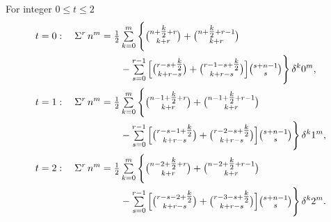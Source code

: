\begin{example}
  For integer $0 \leq t \leq 2$
  \begin{align*}
    t=0:\quad
    \Sigma^{r}\,{n}^{m}
    &=
    \tfrac12
    \mathop{\textstyle\sum}_{k=0}^{m}
    \Bigg\{
      \tbinom{n+\tfrac{k}{2}+r}{k+r}
      +
      \tbinom{n+\tfrac{k}{2}+r-1}{k+r}
      \\
      &\qquad-
      \mathop{\textstyle\sum}_{s=0}^{r-1}
      \Big[
        \tbinom{r-s+\tfrac{k}{2}}{k+r-s}
        +
        \tbinom{r-1-s+\tfrac{k}{2}}{k+r-s}
      \Big]
      \tbinom{s+n-1}{s}
    \Bigg\}
    \,\delta^k 0^m ,
    \\
    t=1:\quad
    \Sigma^{r}\,{n}^{m}
    &=
    \tfrac12
    \mathop{\textstyle\sum}_{k=0}^{m}
    \Bigg\{
      \tbinom{n-1+\tfrac{k}{2}+r}{k+r}
      +
      \tbinom{n-1+\tfrac{k}{2}+r-1}{k+r}
      \\
      &\qquad-
      \mathop{\textstyle\sum}_{s=0}^{r-1}
      \Big[
        \tbinom{r-s-1+\tfrac{k}{2}}{k+r-s}
        +
        \tbinom{r-2-s+\tfrac{k}{2}}{k+r-s}
      \Big]
      \tbinom{s+n-1}{s}
    \Bigg\}
    \,\delta^k 1^m ,
    \\
    t=2:\quad
    \Sigma^{r}\,{n}^{m}
    &=
    \tfrac12
    \mathop{\textstyle\sum}_{k=0}^{m}
    \Bigg\{
      \tbinom{n-2+\tfrac{k}{2}+r}{k+r}
      +
      \tbinom{n-2+\tfrac{k}{2}+r-1}{k+r}
      \\
      &\qquad-
      \mathop{\textstyle\sum}_{s=0}^{r-1}
      \Big[
        \tbinom{r-s-2+\tfrac{k}{2}}{k+r-s}
        +
        \tbinom{r-3-s+\tfrac{k}{2}}{k+r-s}
      \Big]
      \tbinom{s+n-1}{s}
    \Bigg\}
    \,\delta^k 2^m .
  \end{align*}
\end{example}
